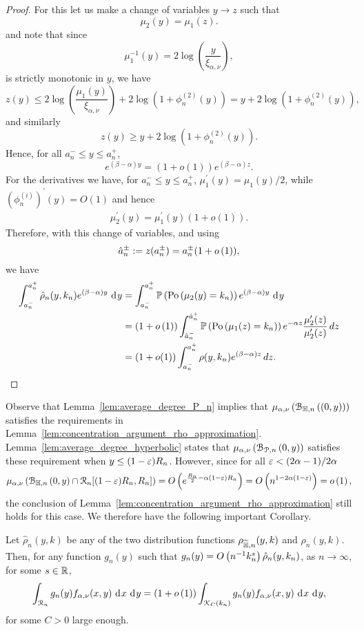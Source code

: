 \begin{proof}
For this let us make a change of variables $y \to z$ such that
\[
	\mu_2(y) = \mu_1(z).
\]
and note that since
\[
	\mu_1^{-1}(y) = 2 \log\left(\frac{y}{\xi_{\alpha,\nu}}\right),
\]
is strictly monotonic in $y$, we have
\[
	z(y) \le 2 \log\left(\frac{\mu_1(y)}{\xi_{\alpha,\nu}}\right) + 2 \log\left(1 + \phi_n^{(2)}(y)\right)
	= y + 2 \log\left(1 + \phi_n^{(2)}(y)\right),
\]
and similarly
\[
	z(y) \ge y + 2 \log\left(1 + \phi_n^{(2)}(y)\right).
\]
Hence, for all $a_n^- \le y \le a_n^+$,
\begin{equation}
	e^{(\beta-\alpha) y} = (1 + o(1))e^{(\beta-\alpha) z}.
\end{equation}
For the derivatives we have, for $a_n^- \le y \le a_n^+$, $\mu_1^\prime(y) = \mu_1(y)/2$, while $(\phi_n^{(i)})^\prime(y) = O(1)$ and hence
\begin{align*}
	\mu_2^\prime(y) = \mu_1^\prime(y)\left(1 + o(1)\right).
\end{align*}
Therefore, with this change of variables, and using
\[
	\hat{a}_n^\pm := z(a_n^\pm) = a_n^\pm(1 + o\left(1\right)),
\] 
we have
\begin{align*}
	\int_{a_n^-}^{a_n^+} \hat{\rho}_n(y,k_n) e^{(\beta - \alpha)y} \operatorname{\, \mathrm{d}\hspace{-1pt}} y
	&=  \int_{a_n^-}^{a_n^+} \mathbb{P}\left(\mathrm{Po}\left(\mu_2(y) = k_n\right)\right) e^{(\beta-\alpha) y} \operatorname{\, \mathrm{d}\hspace{-1pt}} y\\
	&= (1 + o\left(1\right))\int_{\hat{a}_n^-}^{\hat{a}_n^+} \mathbb{P}\left(\mathrm{Po}\left(\mu_1(z) = k_n\right)\right)
		e^{-\alpha z} \frac{\mu_2^\prime(z)}{\mu_2^{\prime}(z)} \, dz\\
	&= \left(1 + o(1)\right) \int_{a_n^-}^{a_n^+} \rho(y,k_n) e^{(\beta-\alpha) z} \, dz.
\end{align*}
\end{proof}

Observe that Lemma~\ref{lem:average_degree_P_n} implies that $\mu_{\alpha,\nu}\left({\mathcal B}_{\mathbb{H},n}\left((0,y)\right)\right)$ satisfies the requirements in Lemma~\ref{lem:concentration_argument_rho_approximation}. Lemma~\ref{lem:average_degree_hyperbolic} states that $\mu_{\alpha,\nu}\left({\mathcal B}_{{\mathcal P},n}\left(0,y\right)\right)$ satisfies these requirement when $y \le (1-\varepsilon)R_n$. However, since for all $\varepsilon < (2\alpha - 1)/2\alpha$
\[
	\mu_{\alpha,\nu}\left({\mathcal B}_{\mathbb{H},n}\left(0,y\right) \cap {\mathcal R}_n[(1-\varepsilon)R_n, R_n]\right) = O\left(e^{\frac{R_n}{2} - \alpha(1-\varepsilon)R_n}\right)
	= O\left(n^{1 - 2\alpha(1 -\varepsilon)}\right) = o\left(1\right),
\]
the conclusion of Lemma~\ref{lem:concentration_argument_rho_approximation} still holds for this case. We therefore have the following important Corollary.

\begin{corollary}\label{cor:concentration_argument_other_models}
Let $\hat{\rho}_n(y,k)$ be any of the two distribution functions $\rho_{\widetilde{\mathbb{H}},n}(y,k)$ and $\rho_{n}(y,k)$. Then, for any function $g_n(y)$ such that $g_n(y) = O\left(n^{-1} k_n^{s}\right)\hat{\rho}_n(y,k_n)$, as $n \to \infty$, for some $s \in {\ensuremath{\mathbb R}}$,
\[
	\int_{{\mathcal R}_n} g_n(y) f_{\alpha,\nu}(x,y) \operatorname{\, \mathrm{d}\hspace{-1pt}} x \operatorname{\, \mathrm{d}\hspace{-1pt}} y
	= (1+o\left(1\right))\int_{{\mathcal K}_C(k_n)} g_n(y) f_{\alpha,\nu}(x,y) \operatorname{\, \mathrm{d}\hspace{-1pt}} x \operatorname{\, \mathrm{d}\hspace{-1pt}} y,
\]
for some $C > 0$ large enough.
\end{corollary}

